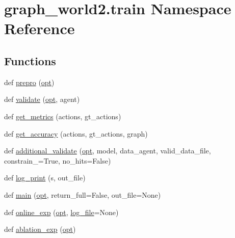 \hypertarget{namespacegraph__world2_1_1train}{}\section{graph\+\_\+world2.\+train Namespace Reference}
\label{namespacegraph__world2_1_1train}
\subsection*{Functions}
\begin{DoxyCompactItemize}
\item 
def \hyperlink{namespacegraph__world2_1_1train_ac238655ccbc748146d1cbaaac96433a5}{prepro} (\hyperlink{namespacegraph__world2_1_1train_a286634b8300deedee0924d4ecac34fa6}{opt})
\item 
def \hyperlink{namespacegraph__world2_1_1train_aa00e41e1619128901ea053170fedef0b}{validate} (\hyperlink{namespacegraph__world2_1_1train_a286634b8300deedee0924d4ecac34fa6}{opt}, agent)
\item 
def \hyperlink{namespacegraph__world2_1_1train_ab3ba8ae63848a00ac638b31329041f6b}{get\+\_\+metrics} (actions, gt\+\_\+actions)
\item 
def \hyperlink{namespacegraph__world2_1_1train_a8bb8c5ab11be91db36eb268e1c2088a8}{get\+\_\+accuracy} (actions, gt\+\_\+actions, graph)
\item 
def \hyperlink{namespacegraph__world2_1_1train_aaff96a1b7f0cafac9dab96cbc02ae4d0}{additional\+\_\+validate} (\hyperlink{namespacegraph__world2_1_1train_a286634b8300deedee0924d4ecac34fa6}{opt}, model, data\+\_\+agent, valid\+\_\+data\+\_\+file, constrain\+\_\+=True, no\+\_\+hits=False)
\item 
def \hyperlink{namespacegraph__world2_1_1train_a145007eac2c8c1c128ec06f4477c943e}{log\+\_\+print} (s, out\+\_\+file)
\item 
def \hyperlink{namespacegraph__world2_1_1train_af3dec887619817c1a7a38930ffcfd1cb}{main} (\hyperlink{namespacegraph__world2_1_1train_a286634b8300deedee0924d4ecac34fa6}{opt}, return\+\_\+full=False, out\+\_\+file=None)
\item 
def \hyperlink{namespacegraph__world2_1_1train_a8f5e91b9cb92f65b8b096d7eb5dbf2e7}{online\+\_\+exp} (\hyperlink{namespacegraph__world2_1_1train_a286634b8300deedee0924d4ecac34fa6}{opt}, \hyperlink{namespacegraph__world2_1_1train_ab4fed977b76754e4f0d9b2593205e54b}{log\+\_\+file}=None)
\item 
def \hyperlink{namespacegraph__world2_1_1train_a4a2155646856189e143dbc828baef945}{ablation\+\_\+exp} (\hyperlink{namespacegraph__world2_1_1train_a286634b8300deedee0924d4ecac34fa6}{opt})
\end{DoxyCompactItemize}
